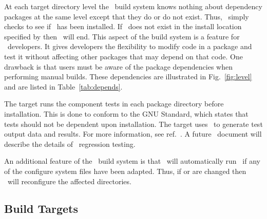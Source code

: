 At each target directory level the \draco\ build system knows nothing
about dependency packages at the same level except that they do or do
not exist.  Thus, \cfour\ simply checks to see if \dsxx\ has been
installed.  If \dsxx\ does not exist in the install location specified
by  then \gmake\ will end.  This aspect of the build
system is a feature for \draco\ developers.  It gives developers the
flexibility to modify code in a package and test it without affecting
other packages that may depend on that code.  One drawback is that
users must be aware of the package dependencies when performing manual
builds.  These dependencies are illustrated in Fig.~\ref{fig:level}
and are listed in Table~\ref{tab:depends}.

The  target runs the component tests in each package
directory before installation.  This is done to conform to the GNU
Standard, which states that tests should not be dependent upon
installation.  The  target uses \dejagnu\ to generate test 
output data and results.  For more information, see
ref.~\cite{dejagnu}.  A future \draco\ document will describe the
details of \draco\ regression testing.

An additional feature of the \draco\ build system is that \draco\ will 
automatically run \autoconf\ if any of the configure system files have 
been adapted.  Thus, if  or  are
changed then \gmake\ will reconfigure the affected directories.  

\subsection{Build Targets}

